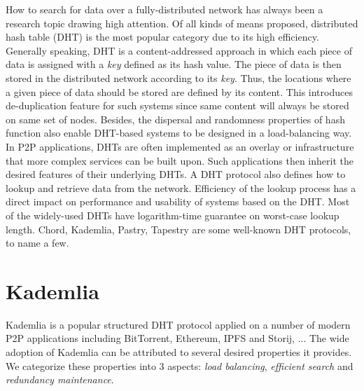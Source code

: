 How to search for data over a fully-distributed network has always been a research topic drawing high attention. Of all kinds of means proposed, distributed hash table (DHT) is the most popular category due to its high efficiency. Generally speaking, DHT is a content-addressed approach in which each piece of data is assigned with a \textit{key} defined as its hash value. The piece of data is then stored in the distributed network according to its \textit{key}. Thus, the locations where a given piece of data should be stored are defined by its content. This introduces de-duplication feature for such systems since same content will always be stored on same set of nodes. Besides, the dispersal and randomness properties of hash function also enable DHT-based systems to be designed in a load-balancing way. In P2P applications, DHTs are often implemented as an overlay or infrastructure that more complex services can be built upon. Such applications then inherit the desired features of their underlying DHTs. A DHT protocol also defines how to lookup and retrieve data from the network. Efficiency of the lookup process has a direct impact on performance and usability of systems based on the DHT. Most of the widely-used DHTs have logarithm-time guarantee on worst-case lookup length. Chord\cite{stoica2001chord}, Kademlia\cite{maymounkov2002kademlia}, Pastry\cite{rowstron2001pastry}, Tapestry\cite{zhao2004tapestry} are some well-known DHT protocols, to name a few.

\section{Kademlia}
\label{s:kademlia}
Kademlia\cite{maymounkov2002kademlia} is a popular structured DHT protocol applied on a number of modern P2P applications including BitTorrent\cite{bittorrent}, Ethereum\cite{ethereum}, IPFS\cite{ipfs} and Storij\cite{storij}, ... The wide adoption of Kademlia can be attributed to several desired properties it provides. We categorize these properties into 3 aspects: \textit{load balancing}, \textit{efficient search} and \textit{redundancy maintenance}.

